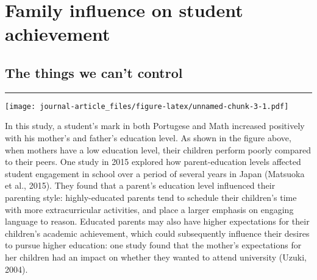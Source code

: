 \documentclass[
]{article}
\newenvironment{Shaded}{\begin{snugshade}}{\end{snugshade}}
\newcommand{\DataTypeTok}[1]{\textcolor[rgb]{0.13,0.29,0.53}{#1}}
\newcommand{\DecValTok}[1]{\textcolor[rgb]{0.00,0.00,0.81}{#1}}
\newcommand{\KeywordTok}[1]{\textcolor[rgb]{0.13,0.29,0.53}{\textbf{#1}}}
\newcommand{\NormalTok}[1]{#1}
\newcommand{\OperatorTok}[1]{\textcolor[rgb]{0.81,0.36,0.00}{\textbf{#1}}}
\newcommand{\StringTok}[1]{\textcolor[rgb]{0.31,0.60,0.02}{#1}}
\begin{document}
\hypertarget{family-influence-on-student-achievement}{%
\section{Family influence on student
achievement}\label{family-influence-on-student-achievement}}

\hypertarget{the-things-we-cant-control}{%
\subsection{The things we can't
control}\label{the-things-we-cant-control}}

\begin{center}\rule{0.5\linewidth}{0.5pt}\end{center}

\begin{Shaded}
\end{Shaded}

\texttt{[image: journal-article\_files/figure-latex/unnamed-chunk-3-1.pdf]}

In this study, a student's mark in both Portugese and Math increased
positively with his mother's and father's education level. As shown in
the figure above, when mothers have a low education level, their
children perform poorly compared to their peers. One study in 2015
explored how parent-education levels affected student engagement in
school over a period of several years in Japan (Matsuoka et al., 2015).
They found that a parent's education level influenced their parenting
style: highly-educated parents tend to schedule their children's time
with more extracurricular activities, and place a larger emphasis on
engaging language to reason. Educated parents may also have higher
expectations for their children's academic achievement, which could
subsequently influence their desires to pursue higher education: one
study found that the mother's expectations for her children had an
impact on whether they wanted to attend university (Uzuki, 2004).
\end{document}
